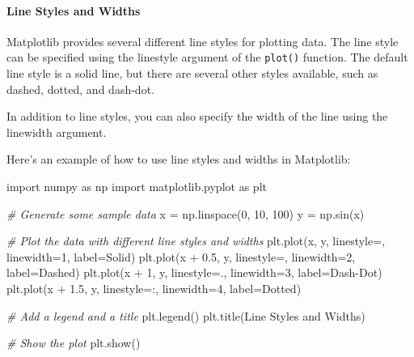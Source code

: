 \documentclass[11pt]{article}
\newenvironment{Shaded}{}{}
\newcommand{\DecValTok}[1]{\textcolor[rgb]{0.25,0.63,0.44}{{#1}}}
\newcommand{\FloatTok}[1]{\textcolor[rgb]{0.25,0.63,0.44}{{#1}}}
\newcommand{\StringTok}[1]{\textcolor[rgb]{0.25,0.44,0.63}{{#1}}}
\newcommand{\CommentTok}[1]{\textcolor[rgb]{0.38,0.63,0.69}{\textit{{#1}}}}
\newcommand{\NormalTok}[1]{{#1}}
\newcommand{\ImportTok}[1]{{#1}}
\newcommand{\OperatorTok}[1]{\textcolor[rgb]{0.40,0.40,0.40}{{#1}}}
\begin{document}
\hypertarget{line-styles-and-widths}{%
\paragraph{Line Styles and Widths}\label{line-styles-and-widths}}

Matplotlib provides several different line styles for plotting data. The
line style can be specified using the linestyle argument of the
\texttt{plot()} function. The default line style is a solid line, but
there are several other styles available, such as dashed, dotted, and
dash-dot.

In addition to line styles, you can also specify the width of the line
using the linewidth argument.

Here's an example of how to use line styles and widths in Matplotlib:

\begin{Shaded}
\begin{Highlighting}[]
\ImportTok{import}\NormalTok{ numpy }\ImportTok{as}\NormalTok{ np}
\ImportTok{import}\NormalTok{ matplotlib.pyplot }\ImportTok{as}\NormalTok{ plt}

\CommentTok{\# Generate some sample data}
\NormalTok{x }\OperatorTok{=}\NormalTok{ np.linspace(}\DecValTok{0}\NormalTok{, }\DecValTok{10}\NormalTok{, }\DecValTok{100}\NormalTok{)}
\NormalTok{y }\OperatorTok{=}\NormalTok{ np.sin(x)}

\CommentTok{\# Plot the data with different line styles and widths}
\NormalTok{plt.plot(x, y, linestyle}\OperatorTok{=}\StringTok{\textquotesingle{}{-}\textquotesingle{}}\NormalTok{, linewidth}\OperatorTok{=}\DecValTok{1}\NormalTok{, label}\OperatorTok{=}\StringTok{\textquotesingle{}Solid\textquotesingle{}}\NormalTok{)}
\NormalTok{plt.plot(x }\OperatorTok{+} \FloatTok{0.5}\NormalTok{, y, linestyle}\OperatorTok{=}\StringTok{\textquotesingle{}{-}{-}\textquotesingle{}}\NormalTok{, linewidth}\OperatorTok{=}\DecValTok{2}\NormalTok{, label}\OperatorTok{=}\StringTok{\textquotesingle{}Dashed\textquotesingle{}}\NormalTok{)}
\NormalTok{plt.plot(x }\OperatorTok{+} \DecValTok{1}\NormalTok{, y, linestyle}\OperatorTok{=}\StringTok{\textquotesingle{}{-}.\textquotesingle{}}\NormalTok{, linewidth}\OperatorTok{=}\DecValTok{3}\NormalTok{, label}\OperatorTok{=}\StringTok{\textquotesingle{}Dash{-}Dot\textquotesingle{}}\NormalTok{)}
\NormalTok{plt.plot(x }\OperatorTok{+} \FloatTok{1.5}\NormalTok{, y, linestyle}\OperatorTok{=}\StringTok{\textquotesingle{}:\textquotesingle{}}\NormalTok{, linewidth}\OperatorTok{=}\DecValTok{4}\NormalTok{, label}\OperatorTok{=}\StringTok{\textquotesingle{}Dotted\textquotesingle{}}\NormalTok{)}

\CommentTok{\# Add a legend and a title}
\NormalTok{plt.legend()}
\NormalTok{plt.title(}\StringTok{\textquotesingle{}Line Styles and Widths\textquotesingle{}}\NormalTok{)}

\CommentTok{\# Show the plot}
\NormalTok{plt.show()}
\end{Highlighting}
\end{Shaded}
\end{document}
